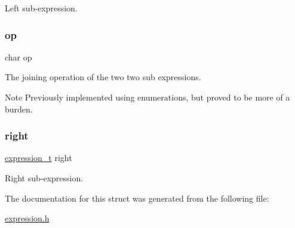 Left sub-\/expression. 

\mbox{\label{structexpression__data__tree_a3d5c605540ca9e9431799d5a79cb94b0}} 
\subsubsection{\texorpdfstring{op}{op}}
{\footnotesize\ttfamily char op}



The joining operation of the two two sub expressions. 

\begin{DoxyNote}{Note}
Previously implemented using enumerations, but proved to be more of a burden. 
\end{DoxyNote}
\mbox{\label{structexpression__data__tree_ad77c9db9f894879970e67e6cb081db60}} 
\subsubsection{\texorpdfstring{right}{right}}
{\footnotesize\ttfamily \hyperlink{expression__lite_8h_ac198bce62637e5d742da0218d544a7ac}{expression\+\_\+t} right}



Right sub-\/expression. 



The documentation for this struct was generated from the following file\+:\begin{DoxyCompactItemize}
\item 
\hyperlink{expression_8h}{expression.\+h}\end{DoxyCompactItemize}
